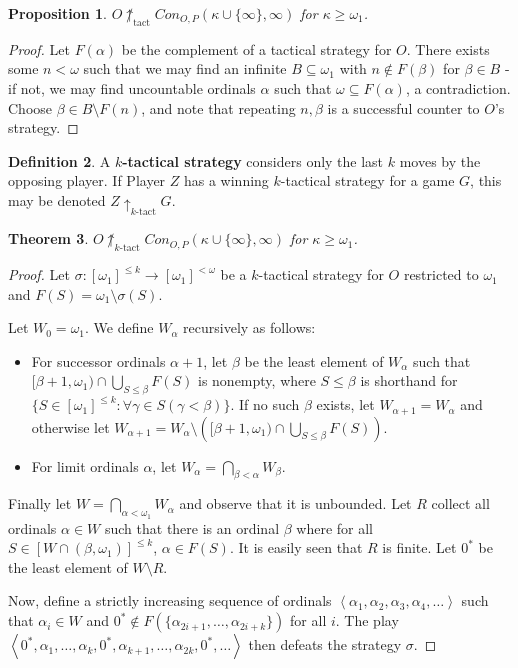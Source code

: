 \documentclass[11pt]{article}
\theoremstyle{plain}
\newtheorem{theorem}{Theorem}
\newtheorem{proposition}[theorem]{Proposition}
\theoremstyle{definition}
\newtheorem{definition}[theorem]{Definition}
\theoremstyle{remark}
\newcommand{\tactwin}{\uparrow_{\text{tact}}}
\newcommand{\ktactwin}[1]{\uparrow_{#1\text{-tact}}}
\begin{document}
\begin{proposition}
$O\not\tactwin Con_{O,P}(\kappa\cup\{\infty\},\infty)$ for $\kappa\geq\omega_1$.
\end{proposition}

\begin{proof}
Let $F(\alpha)$ be the complement of a tactical strategy for $O$. There exists some $n<\omega$ such that we may find an infinite $B\subseteq \omega_1$ with $n\not\in F(\beta)$ for $\beta\in B$ - if not, we may find uncountable ordinals $\alpha$ such that $\omega \subseteq F(\alpha)$, a contradiction. Choose $\beta\in B\setminus F(n)$, and note that repeating $n,\beta$ is a successful counter to $O$'s strategy.
\end{proof}

\begin{definition}
A \textbf{$k$-tactical strategy} considers only the last $k$ moves by the opposing player. If Player $Z$ has a winning $k$-tactical strategy for a game $G$, this may be denoted $Z \ktactwin{k} G$.
\end{definition}

\begin{theorem}
$O\not\ktactwin{k}Con_{O,P}(\kappa\cup\{\infty\},\infty)$ for $\kappa\geq\omega_1$.
\end{theorem}

\begin{proof}
Let $\sigma:[\omega_1]^{\leq k}\to[\omega_1]^{<\omega}$ be a $k$-tactical strategy for $O$ restricted to $\omega_1$ and $F(S)=\omega_1\setminus\sigma(S)$.

Let $W_0=\omega_1$. We define $W_\alpha$ recursively as follows:
    \begin{itemize}
    \item For successor ordinals $\alpha+1$, let $\beta$ be the least element of $W_\alpha$ such that $[\beta+1,\omega_1) \cap \bigcup_{S\leq \beta} F(S)$ is nonempty, where $S \leq \beta$ is shorthand for $\{S \in [\omega_1]^{\leq k} : \forall \gamma \in S(\gamma < \beta)\}$. If no such $\beta$ exists, let $W_{\alpha+1}=W_\alpha$ and otherwise let $W_{\alpha+1}=W_\alpha \setminus \left([\beta+1,\omega_1) \cap \bigcup_{S\leq \beta} F(S)\right)$.
    \item For limit ordinals $\alpha$, let $W_\alpha = \bigcap_{\beta<\alpha} W_\beta$.
    \end{itemize}

Finally let $W=\bigcap_{\alpha<\omega_1}W_\alpha$ and observe that it is unbounded. Let $R$ collect all ordinals $\alpha\in W$ such that there is an ordinal $\beta$ where for all $S\in[W\cap(\beta,\omega_1)]^{\leq k}$, $\alpha \in F(S)$. It is easily seen that $R$ is finite. Let $0^*$ be the least element of $W\setminus R$.

Now, define a strictly increasing sequence of ordinals $\left<\alpha_1,\alpha_2,\alpha_3,\alpha_4,\dots\right>$ such that $\alpha_i \in W$ and $0^* \not\in F(\{\alpha_{2i+1},\dots,\alpha_{2i+k}\})$ for all $i$. The play $\left<0^*,\alpha_1,\dots,\alpha_k,0^*,\alpha_{k+1},\dots,\alpha_{2k},0^*,\dots\right>$ then defeats the strategy $\sigma$.
\end{proof}
\end{document}
